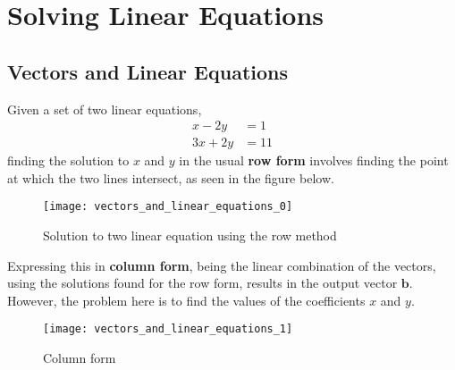 \section{Solving Linear Equations}
    
    \subsection{Vectors and Linear Equations}
        Given a set of two linear equations,
        \begin{equation}
            \begin{split}
                x - 2y &= 1 \\
                3x + 2y &= 11
            \end{split}
        \end{equation}
        finding the solution to \(x\) and \(y\) in the usual \textbf{row form} involves finding the point at which the two lines intersect, as seen in the figure below.
        \begin{figure}[h]
            \texttt{[image: vectors\_and\_linear\_equations\_0]}
            \centering
            \caption{Solution to two linear equation using the row method}
        \end{figure}
        \par \hfill \break
        Expressing this in \textbf{column form}, being the linear combination of the vectors, using the solutions found
        for the row form, results in the output vector \(\boldsymbol{b}\). However, the problem here is to find the 
        values of the coefficients \(x\) and \(y\).
        \begin{figure}[h]
            \texttt{[image: vectors\_and\_linear\_equations\_1]}
            \centering
            \caption{Column form}
        \end{figure}

